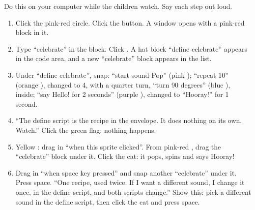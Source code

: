 \begin{workedexample}
Do this on your computer while the children watch. Say each step out loud.
\begin{enumerate}[leftmargin=1.4em,itemsep=1pt]
  \item Click the pink-red  circle. Click the  button. A window opens with a pink-red block in it.
  \item Type \enquote{celebrate} in the block. Click . A hat block \enquote{define celebrate} appears in the code area, and a new \enquote{celebrate} block appears in the list.
  \item Under \enquote{define celebrate}, snap: \enquote{start sound Pop} (pink ); \enquote{repeat 10} (orange ), changed to 4, with a quarter turn, \enquote{turn 90 degrees} (blue ), inside; \enquote{say Hello! for 2 seconds} (purple ), changed to \enquote{Hooray!} for 1 second.
  \item \enquote{The define script is the recipe in the envelope. It does nothing on its own. Watch.} Click the green flag: nothing happens.
  \item Yellow : drag in \enquote{when this sprite clicked}. From pink-red , drag the \enquote{celebrate} block under it. Click the cat: it pops, spins and says Hooray!
  \item Drag in \enquote{when space key pressed} and snap another \enquote{celebrate} under it. Press space. \enquote{One recipe, used twice. If I want a different sound, I change it once, in the define script, and both scripts change.} Show this: pick a different sound in the define script, then click the cat and press space.
\end{enumerate}
\begin{center}
\begin{scratch}[scale=0.85]
\end{scratch}
\quad
\begin{scratch}[scale=0.85]
\end{scratch}
\quad
\begin{scratch}[scale=0.85]
\end{scratch}
\end{center}
\end{workedexample}

